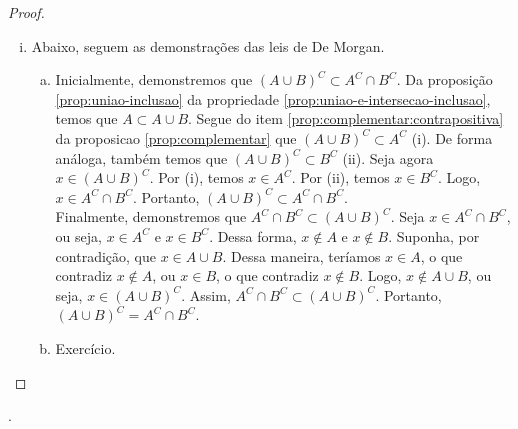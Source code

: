 \begin{proof}
\begin{enumerate}[i)]
    \item Abaixo, seguem as demonstrações das leis de De Morgan.
        \begin{enumerate}[a)]
            \item
                Inicialmente, demonstremos que $(A \cup B)^C \subset A^C \cap B^C$. Da proposição \ref{prop:uniao-inclusao} da propriedade \ref{prop:uniao-e-intersecao-inclusao}, temos que $A \subset A \cup B$. Segue do item \ref{prop:complementar:contrapositiva} da proposicao \ref{prop:complementar} que $(A \cup B)^C \subset A^C$ (i). De forma análoga, também temos que $(A \cup B)^C \subset B^C$ (ii). Seja agora $x \in (A \cup B)^C$. Por (i), temos $x \in A^C$. Por (ii), temos $x \in B^C$. Logo, $x \in A^C \cap B^C$. Portanto, $(A \cup B)^C \subset A^C \cap B^C$. \\
                Finalmente, demonstremos que $A^C \cap B^C \subset (A \cup B)^C$. Seja $x \in A^C \cap B^C$, ou seja, $x \in A^C$ e $x \in B^C$. Dessa forma, $x \not\in A$ e $x \not\in B$. Suponha, por contradição, que $x \in A \cup B$. Dessa maneira, teríamos $x \in A$, o que contradiz $x \not\in A$, ou $x \in B$, o que contradiz $x \not\in B$. Logo, $x \not\in A \cup B$, ou seja, $x \in (A \cup B)^C$. Assim, $A^C \cap B^C \subset (A \cup B)^C$. Portanto, $(A \cup B)^C = A^C \cap B^C$.
            \item
                Exercício.
        \end{enumerate}
\end{enumerate}
\end{proof}

\begin{onlineact}
.
\end{onlineact}

